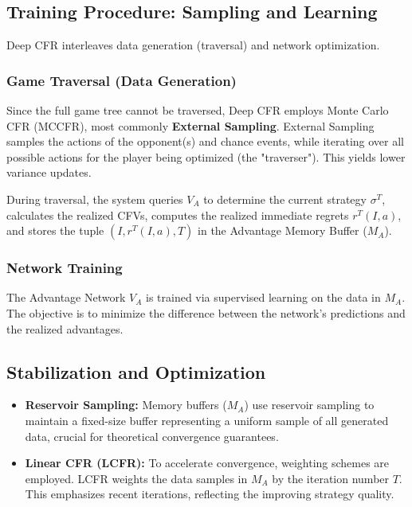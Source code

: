 \documentclass[11pt,a4paper]{article}
\begin{document}
\subsection{Training Procedure: Sampling and Learning}

Deep CFR interleaves data generation (traversal) and network optimization.

\subsubsection{Game Traversal (Data Generation)}

Since the full game tree cannot be traversed, Deep CFR employs Monte Carlo CFR (MCCFR), most commonly \textbf{External Sampling}. External Sampling samples the actions of the opponent(s) and chance events, while iterating over all possible actions for the player being optimized (the "traverser"). This yields lower variance updates.

During traversal, the system queries $V_A$ to determine the current strategy $\sigma^T$, calculates the realized CFVs, computes the realized immediate regrets $r^T(I, a)$, and stores the tuple $(I, r^T(I, a), T)$ in the Advantage Memory Buffer ($M_A$).

\subsubsection{Network Training}

The Advantage Network $V_A$ is trained via supervised learning on the data in $M_A$. The objective is to minimize the difference between the network's predictions and the realized advantages.

\subsection{Stabilization and Optimization}

\begin{itemize}
    \item \textbf{Reservoir Sampling:} Memory buffers ($M_A$) use reservoir sampling to maintain a fixed-size buffer representing a uniform sample of all generated data, crucial for theoretical convergence guarantees.
    \item \textbf{Linear CFR (LCFR):} To accelerate convergence, weighting schemes are employed. LCFR weights the data samples in $M_A$ by the iteration number $T$. This emphasizes recent iterations, reflecting the improving strategy quality.
\end{itemize}
\end{document}
